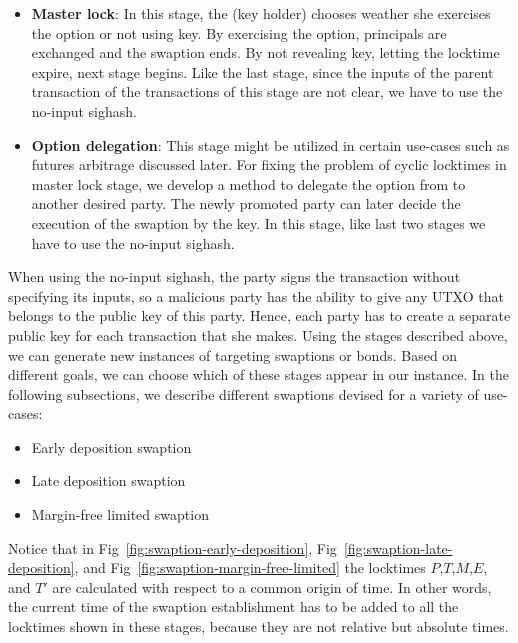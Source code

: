 \begin{itemize}
    \item \textbf{Master lock}: In this stage, the \SwaptionOwner (\Atwo key holder) chooses weather she exercises the option or not using \Atwo key. By exercising the option, principals are exchanged and the swaption ends. By not revealing \Atwo key, letting the locktime expire, next stage begins. Like the last stage, since the inputs of the parent transaction of the transactions of this stage are not clear, we have to use the no-input sighash.
    
    \item \textbf{Option delegation}: This stage might be utilized in certain use-cases such as futures arbitrage discussed later. For fixing the problem of cyclic locktimes in master lock stage, we develop a method to delegate the option from \SwaptionOwner to another desired party. The newly promoted party can later decide the execution of the swaption by the \Delegation key. In this stage, like last two stages we have to use the no-input sighash.

\end{itemize}

When using the no-input sighash, the party signs the transaction without specifying its inputs, so a malicious party has the ability to give any UTXO that belongs to the public key of this party. Hence, each party has to create a separate public key for each transaction that she makes.
Using the stages described above, we can generate new instances of \MetaSwaption targeting swaptions or bonds. Based on different goals, we can choose which of these stages appear in our instance. In the following subsections, we describe different swaptions devised for a variety of use-cases:
\begin{itemize}
    \item Early deposition swaption
    \item Late deposition swaption
    \item Margin-free limited swaption
\end{itemize}
Notice that in Fig~\ref{fig:swaption-early-deposition}, Fig~\ref{fig:swaption-late-deposition}, and Fig~\ref{fig:swaption-margin-free-limited} the locktimes $P$,$T$,$M$,$E$, and $T'$ are calculated with respect to  a common origin of time. In other words, the current time of the swaption establishment has to be added to all the locktimes shown in these stages, because they are not relative but absolute times. 


